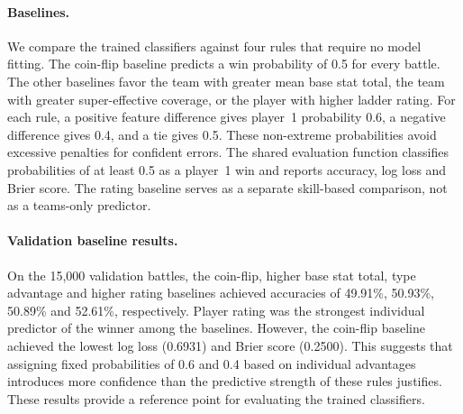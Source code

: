 \paragraph{Baselines.}
We compare the trained classifiers against four rules that require no model
fitting. The coin-flip baseline predicts a win probability of 0.5 for every
battle. The other baselines favor the team with greater mean base stat total,
the team with greater super-effective coverage, or the player with higher
ladder rating. For each rule, a positive feature difference gives player~1
probability 0.6, a negative difference gives 0.4, and a tie gives 0.5. These
non-extreme probabilities avoid excessive penalties for confident errors.
The shared evaluation function classifies probabilities of at least 0.5 as a
player~1 win and reports accuracy, log loss and Brier score. The rating baseline
serves as a separate skill-based comparison, not as a teams-only predictor.

\paragraph{Validation baseline results.}
On the 15,000 validation battles, the coin-flip, higher base stat total, type advantage and higher rating baselines achieved accuracies of 49.91\%, 50.93\%, 50.89\% and 52.61\%, respectively. Player rating was the strongest individual predictor of the winner among the baselines. However, the coin-flip baseline achieved the lowest log loss (0.6931) and Brier score (0.2500). This suggests that assigning fixed probabilities of 0.6 and 0.4 based on individual advantages introduces more confidence than the predictive strength of these rules justifies. These results provide a reference point for evaluating the trained classifiers.
